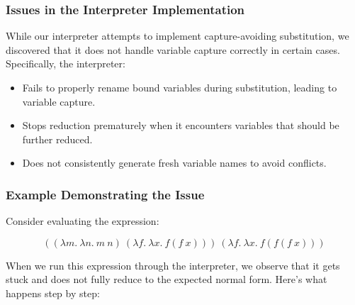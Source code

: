 \documentclass{article}
\begin{document}
\subsubsection*{Issues in the Interpreter Implementation}

While our interpreter attempts to implement capture-avoiding substitution, we discovered that it does not handle variable capture correctly in certain cases. Specifically, the interpreter:

\begin{itemize}
    \item Fails to properly rename bound variables during substitution, leading to variable capture.
    \item Stops reduction prematurely when it encounters variables that should be further reduced.
    \item Does not consistently generate fresh variable names to avoid conflicts.
\end{itemize}

\subsubsection*{Example Demonstrating the Issue}

Consider evaluating the expression:

\[
((\lambda m.\ \lambda n.\ m\ n)\ (\lambda f.\ \lambda x.\ f(f\ x)))\ (\lambda f.\ \lambda x.\ f(f(f\ x)))
\]

When we run this expression through the interpreter, we observe that it gets stuck and does not fully reduce to the expected normal form. Here's what happens step by step:
\end{document}
